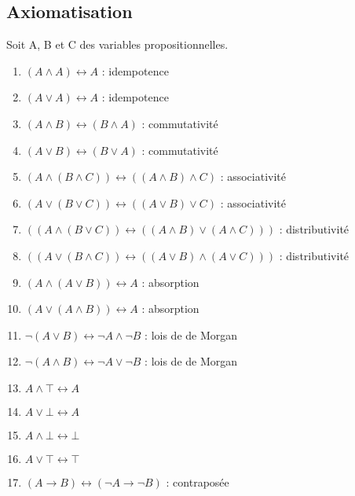 \documentclass{article}
\begin{document}
\subsection{Axiomatisation}
Soit A, B et C des variables propositionnelles.
\begin{enumerate}
  \item $ (A \wedge A) \leftrightarrow  A$ : idempotence
  \item $ (A \vee A) \leftrightarrow  A$ : idempotence
  \item $ (A \wedge B) \leftrightarrow  (B \wedge A)$ : commutativité
  \item $ (A \vee B) \leftrightarrow  (B \vee A)$ : commutativité
  \item $ (A \wedge (B \wedge C)) \leftrightarrow  ((A \wedge B) \wedge C)$ : associativité
  \item $ (A \vee (B \vee C)) \leftrightarrow  ((A \vee B) \vee C)$ : associativité
  \item $ ((A \wedge (B \vee C)) \leftrightarrow ((A \wedge B) \vee (A \wedge C)))$ : distributivité
  \item $ ((A \vee (B \wedge C)) \leftrightarrow ((A \vee B) \wedge (A \vee C))) $ : distributivité
  \item $ (A \wedge (A \vee B)) \leftrightarrow  A$ : absorption
  \item $ (A \vee (A \wedge B)) \leftrightarrow  A$ : absorption
  \item $ \neg (A \vee B) \leftrightarrow \neg A \wedge \neg B$ : lois de de Morgan
  \item $ \neg (A \wedge B) \leftrightarrow \neg A \vee \neg B$ : lois de de Morgan
  \item $ A \wedge \top \leftrightarrow A$
  \item $ A \vee \bot \leftrightarrow A$
  \item $ A \wedge \bot \leftrightarrow \bot$
  \item $ A \vee \top \leftrightarrow \top$
  \item $ (A \rightarrow B) \leftrightarrow (\neg A \rightarrow \neg B)$ : contraposée
\end{enumerate}
\newpage
\end{document}
